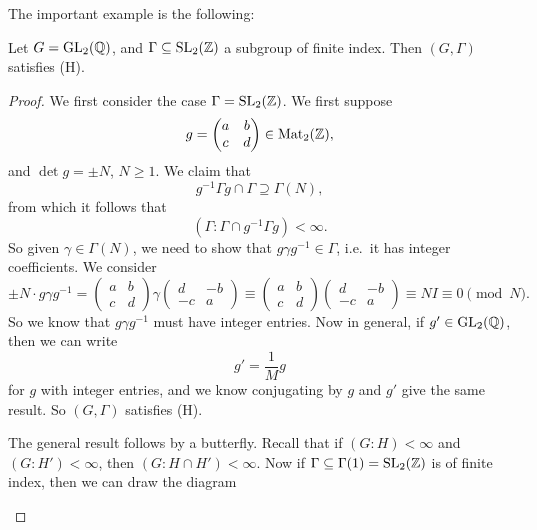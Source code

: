 \documentclass[a4paper]{article}
\begin{document}
The important example is the following:
\begin{thm}
  Let $G = \mathrm{GL}_2(\mathbb{Q})$, and $\Gamma \subseteq \mathrm{SL}_2(\mathbb{Z})$ a subgroup of finite index. Then $(G, \Gamma)$ satisfies (H).
\end{thm}

\begin{proof}
  We first consider the case $\Gamma = \mathrm{SL}_2(\mathbb{Z})$. We first suppose
  \[
    g =
    \begin{pmatrix}
      a & b\\
      c & d
    \end{pmatrix}
    \in \mathrm{Mat}_2(\mathbb{Z}),
  \]
  and $\det g = \pm N$, $N \geq 1$. We claim that
    \[
    g^{-1}\Gamma g \cap \Gamma \supseteq \Gamma(N),
  \]
  from which it follows that
  \[
    (\Gamma : \Gamma \cap g^{-1} \Gamma g) < \infty.
  \]
  So given $\gamma \in \Gamma(N)$, we need to show that $g \gamma g^{-1} \in \Gamma$, i.e.\ it has integer coefficients. We consider
  \[
    \pm N \cdot g \gamma g^{-1} =
    \begin{pmatrix}
      a & b\\
      c & d
    \end{pmatrix} \gamma
    \begin{pmatrix}
      d & -b\\
      -c& a
    \end{pmatrix}
    \equiv
    \begin{pmatrix}
      a & b\\
      c & d
    \end{pmatrix}
    \begin{pmatrix}
      d & -b\\
      -c & a
    \end{pmatrix} \equiv NI \equiv 0\pmod N.
  \]
  So we know that $g \gamma g^{-1}$ must have integer entries. Now in general, if $g' \in \mathrm{GL}_2(\mathbb{Q})$, then we can write
  \[
    g' = \frac{1}{M} g
  \]
  for $g$ with integer entries, and we know conjugating by $g$ and $g'$ give the same result. So $(G, \Gamma)$ satisfies (H).

  \separator

  The general result follows by a butterfly. Recall that if $(G: H) < \infty$ and $(G: H') < \infty$, then $(G: H \cap H') < \infty$. Now if $\Gamma \subseteq \Gamma(1) = \mathrm{SL}_2(\mathbb{Z})$ is of finite index, then we can draw the diagram
  \begin{center}
\end{center}
\end{proof}
\end{document}
